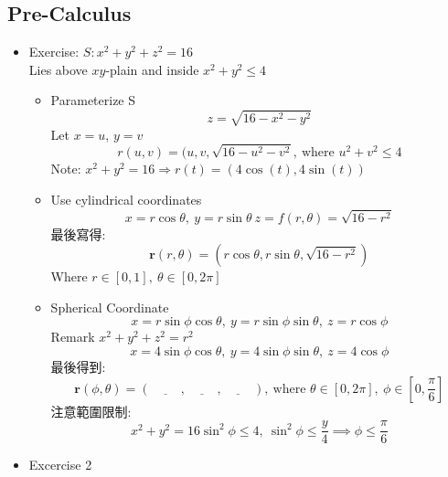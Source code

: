 \documentclass[../main.tex]{subfiles}
\begin{document}
\subsection{Pre-Calculus}
\begin{itemize}
\item Exercise: $S:x^2+y^2+z^2=16$\\
Lies above $xy$-plain and inside $x^2+y^2\leq 4$
\begin{itemize}
\item Parameterize S
\begin{equation}
    z = \sqrt{16 - x^2 - y^2}
\end{equation}
Let $x = u$, $y=v$
\begin{equation}
r(u,v) = (u,v,\sqrt{16-u^2-v^2},~\text{where }u^2+v^2 \leq 4
\end{equation}
Note: $x^2+y^2=16 \Rightarrow r(t) = (4\cos(t), 4\sin (t))$
\item Use cylindrical coordinates
\begin{equation}
x = r\cos \theta,~
y=r\sin \theta ~
z = f(r,\theta) = \sqrt{16 - r^2}
\end{equation}
最後寫得:
\begin{equation}
\mathbf{r}(r,\theta) = (r\cos\theta, r\sin\theta, \sqrt{16-r^2} )
\end{equation}
Where $r \in[0,1],~ \theta \in [0,2\pi]$
\item Spherical Coordinate
\begin{equation}
x=r\sin\phi\cos\theta,~
y=r\sin\phi\sin\theta,~
z= r\cos\phi
\end{equation}
Remark $x^2+y^2+z^2 = r^2$
\begin{equation}
x = 4\sin\phi\cos\theta,~
y = 4\sin\phi\sin\theta,~
z = 4 \cos\phi
\end{equation}
最後得到:
\begin{equation}
\mathbf{r}(\phi,\theta) = \left( \underline{\hspace{1cm}}, \underline{\hspace{1cm}}, \underline{\hspace{1cm}}
\right),~\text{where }\theta \in [0,2\pi], ~\phi\in[0,\frac{\pi}{6}] 
\end{equation}
注意範圍限制:
\begin{equation}
    x^2 + y^2 = 16 \sin^2 \phi \leq 4,~
    \sin^2\phi \leq \frac{y}{4} \implies \phi \leq \frac{\pi}{6}
\end{equation}
\end{itemize}
\item Excercise 2

\end{itemize}
\end{document}

